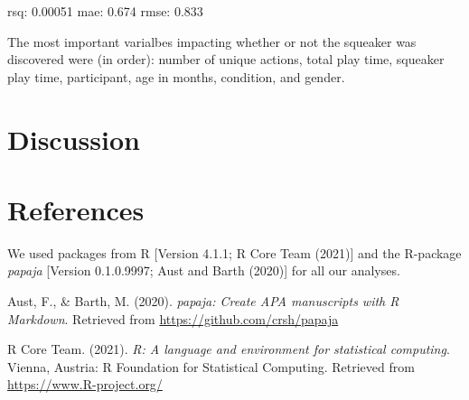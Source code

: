 \documentclass[
  english,
  man]{apa6}
\newlength{\cslhangindent}
\newlength{\cslentryspacingunit} %
\newenvironment{CSLReferences}[2] %
 {%
  \setlength{\parindent}{0pt}
  \ifodd #1
  \let\oldpar\par
  \def\par{\hangindent=\cslhangindent\oldpar}
  \fi
  \setlength{\parskip}{#2\cslentryspacingunit}
 }%
 {}
\begin{document}
rsq: 0.00051
mae: 0.674
rmse: 0.833

The most important varialbes impacting whether or not the squeaker was discovered were (in order): number of unique actions, total play time, squeaker play time, participant, age in months, condition, and gender.

\hypertarget{discussion}{%
\section{Discussion}\label{discussion}}

\newpage

\hypertarget{references}{%
\section{References}\label{references}}

We used packages from R {[}Version 4.1.1; R Core Team (2021){]} and the R-package \emph{papaja} {[}Version 0.1.0.9997; Aust and Barth (2020){]} for all our analyses.

\begingroup
\setlength{\parindent}{-0.5in}
\setlength{\leftskip}{0.5in}

\hypertarget{refs}{}
\begin{CSLReferences}{1}{0}
\leavevmode{}%
Aust, F., \& Barth, M. (2020). \emph{{papaja}: {Create} {APA} manuscripts with {R Markdown}}. Retrieved from \url{https://github.com/crsh/papaja}

\leavevmode{}%
R Core Team. (2021). \emph{R: A language and environment for statistical computing}. Vienna, Austria: R Foundation for Statistical Computing. Retrieved from \url{https://www.R-project.org/}

\end{CSLReferences}

\endgroup
\end{document}
